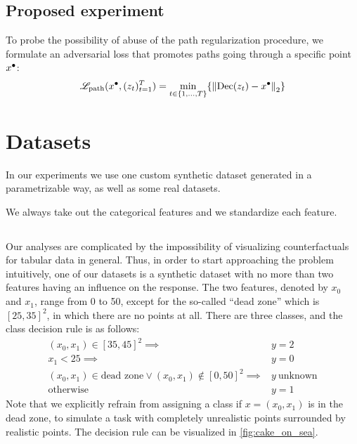 \documentclass[../main.tex]{subfiles}
\begin{document}
\subsection{Proposed experiment}

To probe the possibility of abuse of the path regularization procedure, we formulate an adversarial loss that promotes paths going through a specific point $x^\bullet$:
\begin{align}
    \mathscr{L}_\text{path}(x^\bullet, (z_t)_{t=1}^T) = \min_{t \in \{1, \ldots, T\}} \{ \left\lVert\operatorname{Dec}(z_t) - x^\bullet\right\rVert_2 \}
\end{align}

\section{Datasets}
\label{sec:datasets}

In our experiments we use one custom synthetic dataset generated in a parametrizable way, as well as some real datasets.

We always take out the categorical features and we standardize each feature.

\subsection{\CakeOnSea}

Our analyses are complicated by the impossibility of visualizing counterfactuals for tabular data in general.
Thus, in order to start approaching the problem intuitively, one of our datasets is a synthetic dataset with no more than two features having an influence on the response.
The two features, denoted by $x_0$ and $x_1$, range from 0 to 50, except for the so-called ``dead zone'' which is $[25, 35]^2$, in which there are no points at all.
There are three classes, and the class decision rule is as follows:
\begin{align*}
    (x_0, x_1) \in [35, 45]^2 \implies & y = 2 \\
    x_1 < 25                  \implies & y = 0 \\
    (x_0, x_1) \in \text{dead zone} \lor (x_0, x_1) \notin [0, 50]^2  \implies & y\ \text{unknown} \\
    \text{otherwise} \qquad            & y = 1
\end{align*}
Note that we explicitly refrain from assigning a class if $x = (x_0, x_1)$ is in the dead zone, to simulate a task with completely unrealistic points surrounded by realistic points.
The decision rule can be visualized in \autoref{fig:cake_on_sea}.
\end{document}
